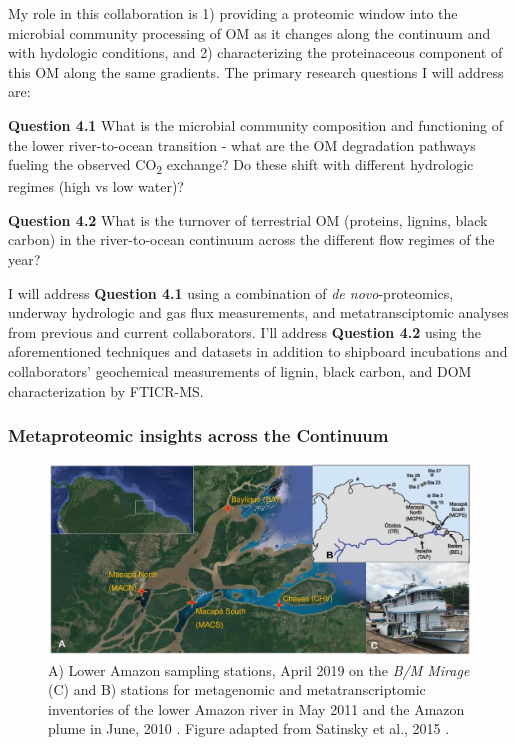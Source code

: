 \documentclass[12pt, letterpaper, twoside]{article}
\begin{document}
My role in this collaboration is 1) providing a proteomic window into the microbial community processing of OM as it changes along the continuum and with hydologic conditions, and 2) characterizing the proteinaceous component of this OM along the same gradients. The primary research questions I will address are:

\bigskip

\textbf{Question 4.1} What is the microbial community composition and functioning of the lower river-to-ocean transition - what are the OM degradation pathways fueling the observed CO\textsubscript{2} exchange? Do these shift with different hydrologic regimes (high vs low water)?

\bigskip

\textbf{Question 4.2} What is the turnover of terrestrial OM (proteins, lignins, black carbon) in the river-to-ocean continuum across the different flow regimes of the year? 

\bigskip

I will address \textbf{Question 4.1} using a combination of \textit{de novo}-proteomics, underway hydrologic and gas flux measurements, and metatransciptomic analyses from previous \cite{doherty_bacterial_2017, satinsky_amazon_2014} and current collaborators. I'll address \textbf{Question 4.2} using the aforementioned techniques and datasets in addition to shipboard incubations and collaborators' geochemical measurements of lignin, black carbon, and DOM characterization by FTICR-MS.

\subsubsection{Metaproteomic insights across the Continuum}

\begin{figure}
	\includegraphics[width=\linewidth]{amazon-sta-map.jpg}
	\caption{A) Lower Amazon sampling stations, April 2019 on the \textit{B/M Mirage } (C) and B) stations for metagenomic and metatranscriptomic inventories of the lower Amazon river \cite{satinsky_metagenomic_2015} in May 2011 and the Amazon plume in June, 2010 \cite{satinsky_amazon_2014}. Figure adapted from Satinsky et al., 2015 \cite{satinsky_metagenomic_2015}.}
	\label{fig:amazon-stations}
\end{figure}
\end{document}
